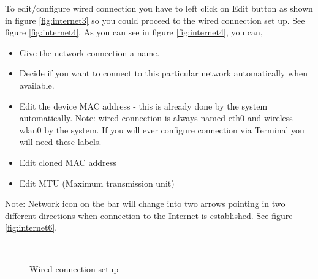 \par \noindent To edit/configure wired connection you have to left click on Edit button as shown in figure \ref{fig:internet3} so you could proceed to the wired connection set up. See figure \ref{fig:internet4}. As you can see in figure \ref{fig:internet4}, you can, 

\begin{itemize}
	\item Give the network connection a name.
	\item Decide if you want to connect to this particular network automatically when available.
	\item Edit the device MAC address  - this is already done by the system automatically. Note: wired connection is always named eth0 and wireless wlan0 by the system. If you will ever configure connection via Terminal you will need these labels. 
	\item Edit cloned MAC address
	\item Edit MTU (Maximum transmission unit)
\end{itemize}

\par \noindent Note: Network icon on the bar will change into two arrows pointing in two different directions when connection to the Internet is established. See figure \ref{fig:internet6}. \\

\begin{figure}[ht!]	
		\centering		
		~ \hspace{0.5in}
		\caption{Wired connection setup}
		\label{fig:internet46}
\end{figure}

